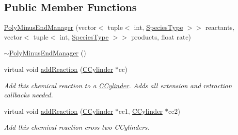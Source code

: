 \subsection*{Public Member Functions}
\begin{DoxyCompactItemize}
\item 
\hyperlink{classPolyMinusEndManager_a99748ff2c949a8e82cdea994fbdde203}{Poly\+Minus\+End\+Manager} (vector$<$ tuple$<$ int, \hyperlink{Species_8h_a50651af47c56ea0e27235468d23542cf}{Species\+Type} $>$$>$ reactants, vector$<$ tuple$<$ int, \hyperlink{Species_8h_a50651af47c56ea0e27235468d23542cf}{Species\+Type} $>$$>$ products, float rate)
\item 
\hyperlink{classPolyMinusEndManager_a9bc71f9b337d5621f42423b948b220a1}{$\sim$\+Poly\+Minus\+End\+Manager} ()
\item 
virtual void \hyperlink{classPolyMinusEndManager_a914c9cd90412261a70c36afdf35653d8}{add\+Reaction} (\hyperlink{classCCylinder}{C\+Cylinder} $\ast$cc)
\begin{DoxyCompactList}\small\item\em Add this chemical reaction to a \hyperlink{classCCylinder}{C\+Cylinder}. Adds all extension and retraction callbacks needed. \end{DoxyCompactList}\item 
virtual void \hyperlink{classPolyMinusEndManager_a164b26aa71eed7a920fd03e636d12dec}{add\+Reaction} (\hyperlink{classCCylinder}{C\+Cylinder} $\ast$cc1, \hyperlink{classCCylinder}{C\+Cylinder} $\ast$cc2)
\begin{DoxyCompactList}\small\item\em Add this chemical reaction cross two C\+Cylinders. \end{DoxyCompactList}\end{DoxyCompactItemize}
